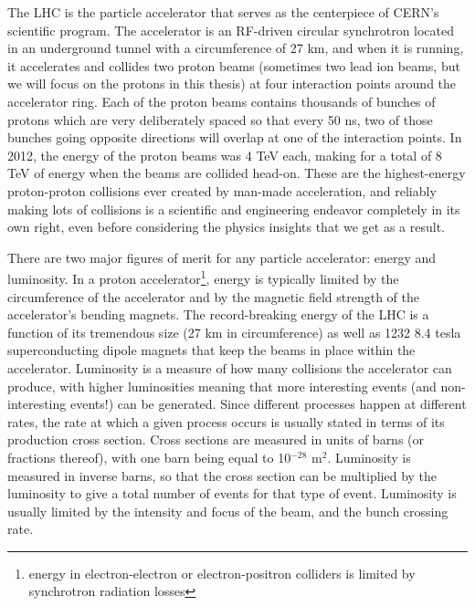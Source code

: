 The LHC is the particle accelerator that serves as the centerpiece of CERN's scientific program.  The accelerator is 
an RF-driven circular synchrotron located in an underground tunnel with a circumference of 27 km, and when 
it is running, it accelerates and collides two proton beams (sometimes two lead ion beams, but we will 
focus on the protons in this thesis) at four interaction points around the accelerator ring.  Each of the proton beams 
contains thousands of bunches of protons which are very deliberately spaced so that every 50 ns, two 
of those bunches going opposite directions will overlap at one of the interaction points.  In 2012, the energy
of the proton beams was 4 TeV each, making for a total of 8 TeV of energy when the beams are collided head-on.
These are the highest-energy proton-proton collisions ever created by man-made acceleration, and reliably making lots of
collisions is a scientific and engineering endeavor completely in its own right, even before considering
the physics insights that we get as a result.


There are two major figures of merit for any particle accelerator: energy and luminosity.  In a
proton accelerator\footnote{energy in electron-electron or electron-positron colliders is limited
by synchrotron radiation losses}, energy is typically limited 
by the circumference of the accelerator and by the magnetic field strength of the accelerator's bending magnets.  
The record-breaking energy of the LHC is a function of its tremendous size (27 km in circumference) as 
well as 1232 8.4 tesla superconducting dipole magnets that keep the beams in place within the accelerator.  Luminosity 
 is a measure of how many collisions the accelerator can produce, with higher luminosities meaning that more 
interesting events (and non-interesting events!) can be generated.  Since different processes happen at different rates, 
the rate at which a given process occurs is usually stated in terms of its production cross section.  
Cross sections are measured in units of barns (or fractions thereof), with one barn being equal to 10$^{-28}$ m$^2$.  
Luminosity is measured in inverse barns, so that the cross section 
can be multiplied by the luminosity to give a total number of events for that type of event.  Luminosity 
is usually limited by the intensity and focus of the beam, and the bunch crossing rate.



